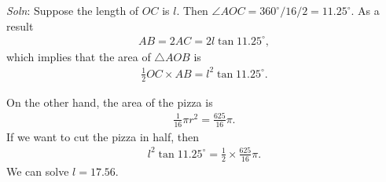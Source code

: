 \documentclass{article}
\begin{document}
\begin{enumerate}
  \emph{Soln}: Suppose the length of $OC$ is $l$. Then $\angle AOC = 360^\circ /16/2 = 11.25^\circ$. As a result
  \begin{align*}
    AB = 2AC = 2l\tan 11.25^\circ,
  \end{align*}
  which implies that the area of $\triangle AOB$ is
  \begin{align*}
    \frac{1}{2}OC\times AB = l^2\tan 11.25^\circ.
  \end{align*}

  On the other hand, the area of the pizza is
  \begin{align*}
    \frac{1}{16}\pi r^2 = \frac{625}{16}\pi.
  \end{align*}
  If we want to cut the pizza in half, then
  \begin{align*}
     l^2\tan 11.25^\circ=\frac{1}{2}\times \frac{625}{16}\pi.
  \end{align*}
We can solve $l = 17.56$.


\end{enumerate}
\end{document}
